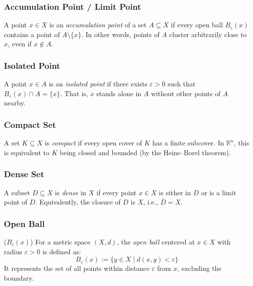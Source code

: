 	 \subsubsection{Accumulation Point / Limit Point}
		 A point \( x \in X \) is an \emph{accumulation point} of a set \( A \subseteq X \)
		  if every open ball \( B_\varepsilon(x) \) contains a point of \( A \setminus \{x\} \). 
	      In other words, points of \( A \) cluster arbitrarily close to 
		  \( x \), even if \( x \notin A \).

	 \subsubsection{Isolated Point} 
	      A point \( x \in A \) is an \emph{isolated point} if there exists \( \varepsilon > 0 \)
		   such that \( B_\varepsilon(x) \cap A = \{x\} \). 
	      That is, \( x \) stands alone in \( A \) without other points of \( A \) nearby.

	 \subsubsection{Compact Set} 
	      A set \( K \subseteq X \) is \emph{compact} if every open cover of \( K \) has a finite subcover. 
	      In \(\mathbb{R}^n\), this is equivalent to \( K \) being closed and bounded (by the Heine–Borel theorem).

	 \subsubsection{Dense Set} 
	      A subset \( D \subseteq X \) is \emph{dense} in \( X \) if every point 
		  \( x \in X \) is either in \( D \) or is a limit point of \( D \). 
	      Equivalently, the closure of \( D \) is \( X \), i.e., \( \overline{D} = X \).

	 \subsubsection{Open Ball} (\( B_\varepsilon(x) \)) 
	      For a metric space \( (X, d) \), the \emph{open ball} centered at 
		  \( x \in X \) with radius \( \varepsilon > 0 \) is defined as: 
	      \[
		      B_\varepsilon(x) := \{ y \in X \mid d(x, y) < \varepsilon \}
	      \]
	      It represents the set of all points within distance \( \varepsilon \) from \( x \), excluding the boundary.

\newpage